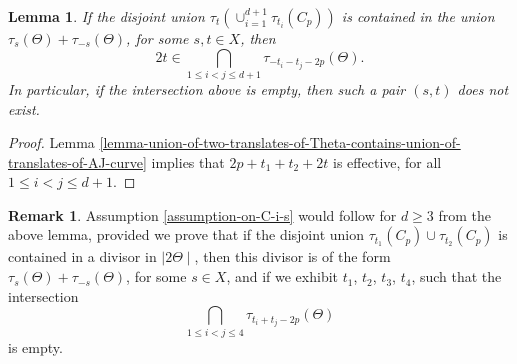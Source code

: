 \documentclass[12pt]{amsart}
\numberwithin{equation}{subsection}
\theoremstyle{plain}
\newtheorem{lem}[thm]{Lemma}
\theoremstyle{definition}
\newtheorem{rem}[thm]{Remark}
\newcommand{\linsys}[1]{{\mid}#1{\mid}}
\begin{document}
{\begin{lem}
If the disjoint union $\tau_t\left(\cup_{i=1}^{d+1}\tau_{t_i}(C_p)\right)$ is contained in the union $\tau_s(\Theta)+\tau_{-s}(\Theta)$, for some $s,t\in X$,
then 
\[
2t\in\bigcap_{1\leq i<j\leq d+1} \tau_{-t_i-t_j-2p}(\Theta).
\]
In particular, if the intersection above is empty, then such a pair $(s,t)$ does not exist.
\end{lem}

\begin{proof}
Lemma \ref{lemma-union-of-two-translates-of-Theta-contains-union-of-translates-of-AJ-curve} implies that $2p+t_1+t_2+2t$ is effective, for all $1\leq i<j\leq d+1$.
\end{proof}

\begin{rem}
Assumption \ref{assumption-on-C-i-s} would follow for $d\geq 3$ from the above lemma, provided we prove that if the disjoint union $\tau_{t_1}(C_p)\cup\tau_{t_2}(C_p)$ is contained in a divisor in $\linsys{2\Theta}$, then this divisor is of the form  $\tau_s(\Theta)+\tau_{-s}(\Theta)$, for some $s\in X$, and if we exhibit $t_1$, $t_2$, $t_3$, $t_4$, such that the intersection
\[
\bigcap_{1\leq i<j\leq 4}\tau_{t_i+t_j-2p}(\Theta)
\]
is empty.
\end{rem}

}
\end{document}

